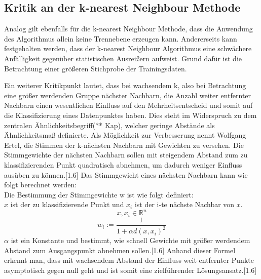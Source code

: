 \documentclass[a4paper]{scrartcl}
\begin{document}
\begin{multicols}{2}
                         \subsection{Kritik an der k-nearest Neighbour Methode}
                        Analog gilt ebenfalls für die k-nearest Neighbour Methode, dass die Anwendung des Algorithmus allein keine Trennebene erzeugen kann.
                        Andererseits kann festgehalten werden, dass der k-nearest Neighbour Algorithmus eine schwächere Anfälligkeit gegenüber statistischen Ausreißern aufweist. Grund dafür ist die Betrachtung einer größeren Stichprobe der Trainingsdaten.
                        
                        Ein weiterer Kritikpunkt lautet, dass bei wachsendem k, also bei Betrachtung eine größer werdenden Gruppe nächster Nachbarn, die Anzahl weiter entfernter Nachbarn einen wesentlichen Einfluss auf den Mehrheitsentscheid und somit auf die Klassifizierung eines Datenpunktes haben. Dies steht im Widerspruch zu dem zentralen Ähnlichkeitsbegriff(** Kap), welcher geringe Abstände als Ähnlichkeitsmaß definierte.
                        Als Möglichkeit zur Verbesserung nennt Wolfgang Ertel, die Stimmen der k-nächsten Nachbarn mit Gewichten zu versehen. Die Stimmgewichte der nächsten Nachbarn sollen mit steigendem Abstand zum zu klassifizierenden Punkt quadratisch abnehmen, um dadurch weniger Einfluss ausüben zu können.[1.6]
                        Das Stimmgewicht eines nächsten Nachbarn kann wie folgt berechnet werden:\\
                        
                        Die Bestimmung der Stimmgewichte w ist wie folgt definiert:\\
                        $x$ ist der zu klassifizierende Punkt und $x_i$ ist der i-te nächste Nachbar von $x$.
                        $$
                            x,x_i \in \mathbb{R}^n
                        $$
                        $$
                            w_i:=\frac{1}{1+\alpha d(x,x_i)^2}
                        $$
                        $\alpha$ ist ein Konstante und bestimmt, wie schnell Gewichte mit größer werdendem Abstand zum Ausgangspunkt abnehmen sollen.[1.6] Anhand dieser Formel erkennt man, dass mit wachsendem Abstand der Einfluss weit entfernter Punkte asymptotisch gegen null geht und ist somit eine zielführender Lösungsansatz.[1.6]

\end{multicols}
\end{document}
